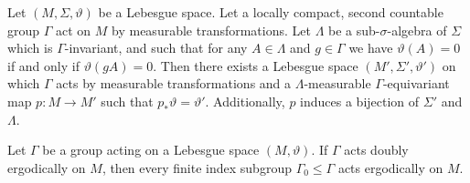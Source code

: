 \begin{thm}
  \label{thm:mackey}
  Let \((M, \Sigma, \vartheta)\) be a Lebesgue space. Let a locally compact, second countable group \(\Gamma\) act on \(M\) by measurable transformations. Let \(\Lambda\) be a sub-\(\sigma\)-algebra of \(\Sigma\) which is \(\Gamma\)-invariant, and such that for any \(A \in \Lambda\) and \(g \in \Gamma\) we have \(\vartheta(A) = 0 \) if and only if \(\vartheta(gA) = 0\). Then there exists a Lebesgue space \((M', \Sigma', \vartheta')\) on which \(\Gamma\) acts by measurable transformations and a \(\Lambda\)-measurable \(\Gamma\)-equivariant map \(p \colon M \to M'\) such that \(p_\ast \vartheta = \vartheta'\). Additionally, \(p\) induces a bijection of \(\Sigma'\) and \(\Lambda\).
\end{thm}

\begin{lemma}[{\cite[Lemma 4.3]{MR3509968}}]
  \label{lem:4.3}
  Let \(\Gamma\) be a group acting on a Lebesgue space \((M, \vartheta)\). If \(\Gamma\) acts doubly ergodically  on \(M\), then every  finite index subgroup \(\Gamma_0 \leq \Gamma\) acts ergodically on \(M\).
\end{lemma}

